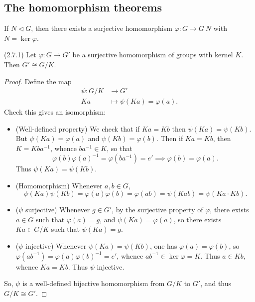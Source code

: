 
\subsection{The homomorphism theorems}

\begin{theorem}
	If $N \triangleleft G$, then there exists a surjective homomorphism $\varphi: G \to  G \ N$ with $N = \operatorname{ker} \varphi$.
\end{theorem}

\begin{theorem}
	(2.7.1)
	Let $\varphi: G \to  G'$ be a surjective homomorphism of groups with kernel $K$. Then $G' \cong G / K$.
\end{theorem}
\begin{proof}
	Define the map  \begin{align*}
		\psi: G / K &\longrightarrow G' \\
		Ka &\longmapsto \psi(Ka) = \varphi(a)
	.\end{align*}
	Check this gives an  isomorphism:

	\begin{itemize}
	\item (Well-defined property)
		We check that if $Ka = Kb$ then $\psi(Ka) = \psi(Kb)$. But $\psi(Ka) = \varphi(a)$ and  $\psi(Kb) = \varphi(b)$. Then if $Ka = Kb$, then $K = K b a^{-1} $, whence $ba^{-1}  \in K$, so that \[
			\varphi(b)\varphi(a)^{-1} = \varphi(ba^{-1} ) = e' \implies \varphi(b) = \varphi(a)
		.\] 
		Thus $\psi(Ka) = \psi(Kb)$.
	\item (Homomorphism)
		Whenever $a, b \in G$, \[
			\psi(Ka) \psi(Kb) 
			=\varphi(a)\varphi(b)
			=\varphi(ab)
			=\psi(Kab)
			=\psi(Ka \cdot Kb)
		.\] 
	\item ($\psi$ surjective)
		Whenever $g \in G'$, by the surjective property of $\varphi$, there exists $a \in G$ such that $\varphi(a) = g$, and $\psi(Ka) = \varphi(a)$, so there exists $Ka \in G / K$ such that $\psi(Ka) = g$.
	\item ($\psi$ injective)
		Whenever $\psi(Ka) = \psi(Kb)$, one has $\varphi(a) = \varphi(b)$, so $\varphi(ab^{-1} )=\varphi(a) \varphi(b)^{-1}= e'$, whence $ab^{-1} \in \operatorname{ker} \varphi = K$.
		Thus $a \in K b$, whence $Ka = Kb$. Thus $\psi$ injective.
	\end{itemize}
	So, $\psi$ is a well-defined bijective homomorphism from $G / K$ to $G'$, and thus $G / K \cong G'$.
\end{proof}

